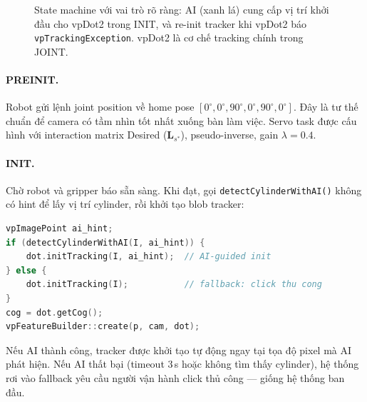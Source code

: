 \begin{figure}[htbp]
  \caption{State machine với vai trò rõ ràng: AI (xanh lá) cung cấp
           vị trí khởi đầu cho vpDot2 trong INIT, và re-init tracker khi
           vpDot2 báo \texttt{vpTrackingException}. vpDot2 là
           cơ chế tracking chính trong JOINT.}
  \label{fig:ai3-sm}
\end{figure}

\paragraph{PREINIT.}
Robot gửi lệnh joint position về home pose
$[0^\circ, 0^\circ, 90^\circ, 0^\circ, 90^\circ, 0^\circ]$.
Đây là tư thế chuẩn để camera có tầm nhìn tốt nhất xuống bàn làm
việc. Servo task được cấu hình với interaction matrix Desired
($\mathbf{L}_{s^*}$), pseudo-inverse, gain $\lambda=0.4$.

\paragraph{INIT.}
Chờ robot và gripper báo sẵn sàng. Khi đạt, gọi
\texttt{detectCylinderWithAI()} không có hint để lấy vị trí
cylinder, rồi khởi tạo blob tracker:
\begin{lstlisting}[language=C++]
vpImagePoint ai_hint;
if (detectCylinderWithAI(I, ai_hint)) {
    dot.initTracking(I, ai_hint);  // AI-guided init
} else {
    dot.initTracking(I);           // fallback: click thu cong
}
cog = dot.getCog();
vpFeatureBuilder::create(p, cam, dot);
\end{lstlisting}

Nếu AI thành công, tracker được khởi tạo tự động ngay tại tọa độ
pixel mà AI phát hiện. Nếu AI thất bại (timeout 3\,s hoặc không
tìm thấy cylinder), hệ thống rơi vào fallback yêu cầu người vận
hành click thủ công --- giống hệ thống ban đầu.

